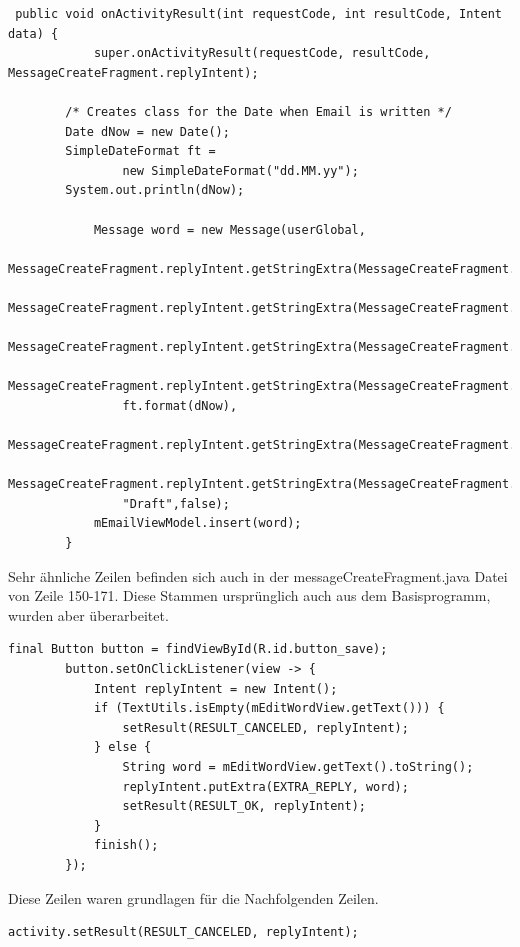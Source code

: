 \documentclass[a4paper,11pt]{article}
\begin{document}
\begin{appendices}
\lstset{language=java}
\begin{lstlisting}
 public void onActivityResult(int requestCode, int resultCode, Intent data) {
            super.onActivityResult(requestCode, resultCode, MessageCreateFragment.replyIntent);

        /* Creates class for the Date when Email is written */
        Date dNow = new Date();
        SimpleDateFormat ft =
                new SimpleDateFormat("dd.MM.yy");
        System.out.println(dNow);

            Message word = new Message(userGlobal,
                MessageCreateFragment.replyIntent.getStringExtra(MessageCreateFragment.EXTRA_TO),
                MessageCreateFragment.replyIntent.getStringExtra(MessageCreateFragment.EXTRA_CC),
                MessageCreateFragment.replyIntent.getStringExtra(MessageCreateFragment.EXTRA_BCC),
                MessageCreateFragment.replyIntent.getStringExtra(MessageCreateFragment.EXTRA_FROM),
                ft.format(dNow),
                MessageCreateFragment.replyIntent.getStringExtra(MessageCreateFragment.EXTRA_SUBJECT),
                MessageCreateFragment.replyIntent.getStringExtra(MessageCreateFragment.EXTRA_MESSAGE),
                "Draft",false);
            mEmailViewModel.insert(word);
        }
\end{lstlisting}

Sehr ähnliche Zeilen befinden sich auch in der messageCreateFragment.java Datei von Zeile 150-171. Diese Stammen ursprünglich auch aus dem Basisprogramm, 
wurden aber überarbeitet. \\

\lstset{language=java}
\begin{lstlisting}
final Button button = findViewById(R.id.button_save);
        button.setOnClickListener(view -> {
            Intent replyIntent = new Intent();
            if (TextUtils.isEmpty(mEditWordView.getText())) {
                setResult(RESULT_CANCELED, replyIntent);
            } else {
                String word = mEditWordView.getText().toString();
                replyIntent.putExtra(EXTRA_REPLY, word);
                setResult(RESULT_OK, replyIntent);
            }
            finish();
        });
\end{lstlisting}

Diese Zeilen waren grundlagen für die Nachfolgenden Zeilen.

\lstset{language=java}
\begin{lstlisting}
activity.setResult(RESULT_CANCELED, replyIntent);


\end{lstlisting}
\end{appendices}
\end{document}
